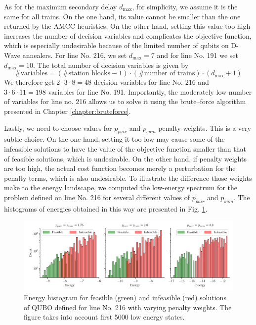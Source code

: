 As for the maximum secondary delay $d_{\max}$, for simplicity, we assume it is the same for all trains. On the one hand, its value cannot be smaller than the one returned by the AMCC heuristics. On the other hand, setting this value too high increases the number of decision variables and complicates the objective function, which is especially undesirable because of the limited number of qubits on D-Wave annealers. For line No. 216, we set $d_{\max}=7$ and for line No. 191 we set $d_{\max}=10$. The total number of decision variables is given by
\begin{equation}
  \mbox{\#variables} = (\mbox{\#station blocks}-1) \cdot (\mbox{\#number of trains}) \cdot (d_{\max}+1)
\end{equation}
We therefore get $2\cdot 3 \cdot 8 = 48$ decision variables for line No. 216 and $3 \cdot 6 \cdot 11 = 198$ variables for line No. 191. Importantly, the moderately low number of variables for line no. 216 allows us to solve it using the brute--force algorithm presented in Chapter \ref{chapter:bruteforce}.

Lastly, we need to choose values for $p_{pair}$ and $p_{sum}$ penalty weights. This is a very subtle choice. On the one hand, setting it too low may cause some of the infeasible solutions to have the value of the objective function smaller than that of feasible solutions, which is undesirable. On the other hand, if penalty weights are too high, the actual cost function becomes merely a perturbation for the penalty terms, which is also undesirable. To illustrate the difference those weights make to the energy landscape, we computed the low-energy spectrum for the problem defined on line No. 216 for several different values of $p_{pair}$ and $p_{sum}$. The histograms of energies obtained in this way are presented in Fig. \ref{fig:penaltyhistogram}.

\begin{figure}
  \includegraphics[width=\textwidth]{figures/railway_histograms_bf}
  \caption{Energy histogram for feasible (green) and infeasible (red) solutions of QUBO defined for line No. 216 with varying penalty weights. The figure takes into account first 5000 low energy states.}
  \label{fig:penaltyhistogram}
\end{figure}
